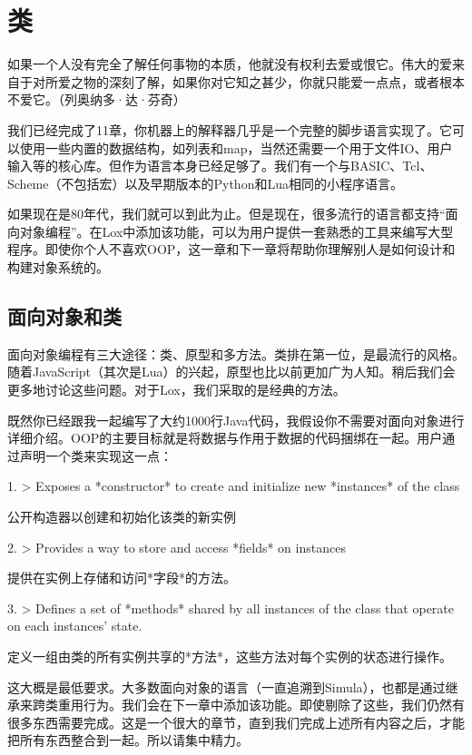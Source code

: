 \documentclass[cn,11pt,chinese]{elegantbook}
\begin{document}
\chapter{类}

如果一个人没有完全了解任何事物的本质，他就没有权利去爱或恨它。伟大的爱来自于对所爱之物的深刻了解，如果你对它知之甚少，你就只能爱一点点，或者根本不爱它。（列奥纳多·达·芬奇）

我们已经完成了11章，你机器上的解释器几乎是一个完整的脚步语言实现了。它可以使用一些内置的数据结构，如列表和map，当然还需要一个用于文件IO、用户输入等的核心库。但作为语言本身已经足够了。我们有一个与BASIC、Tcl、Scheme（不包括宏）以及早期版本的Python和Lua相同的小程序语言。

如果现在是80年代，我们就可以到此为止。但是现在，很多流行的语言都支持“面向对象编程”。在Lox中添加该功能，可以为用户提供一套熟悉的工具来编写大型程序。即使你个人不喜欢OOP，这一章和下一章将帮助你理解别人是如何设计和构建对象系统的。

\section{面向对象和类}

面向对象编程有三大途径：类、原型和多方法。类排在第一位，是最流行的风格。随着JavaScript（其次是Lua）的兴起，原型也比以前更加广为人知。稍后我们会更多地讨论这些问题。对于Lox，我们采取的是经典的方法。

既然你已经跟我一起编写了大约1000行Java代码，我假设你不需要对面向对象进行详细介绍。OOP的主要目标就是将数据与作用于数据的代码捆绑在一起。用户通过声明一个类来实现这一点：

1. > Exposes a *constructor* to create and initialize new *instances* of the class

   公开构造器以创建和初始化该类的新实例

2. > Provides a way to store and access *fields* on instances

   提供在实例上存储和访问*字段*的方法。

3. > Defines a set of *methods* shared by all instances of the class that operate on each instances’ state.

   定义一组由类的所有实例共享的*方法*，这些方法对每个实例的状态进行操作。

这大概是最低要求。大多数面向对象的语言（一直追溯到Simula），也都是通过继承来跨类重用行为。我们会在下一章中添加该功能。即使剔除了这些，我们仍然有很多东西需要完成。这是一个很大的章节，直到我们完成上述所有内容之后，才能把所有东西整合到一起。所以请集中精力。
\end{document}
